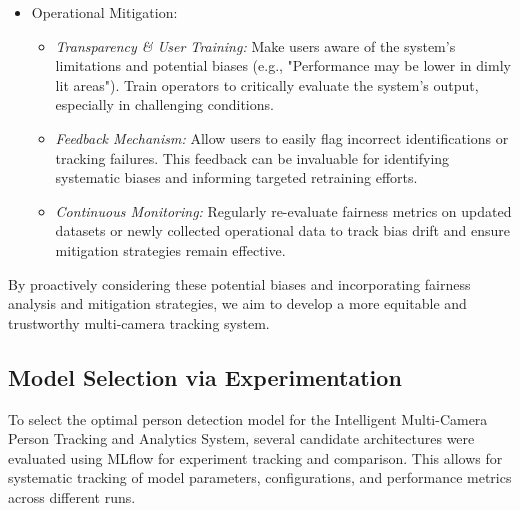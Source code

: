 \begin{itemize}
\begin{itemize}
    \end{itemize}
    \item Operational Mitigation:
    \begin{itemize}
        \item \textit{Transparency \& User Training:} Make users aware of the system's limitations and potential biases (e.g., "Performance may be lower in dimly lit areas"). Train operators to critically evaluate the system's output, especially in challenging conditions.
        \item \textit{Feedback Mechanism:} Allow users to easily flag incorrect identifications or tracking failures. This feedback can be invaluable for identifying systematic biases and informing targeted retraining efforts.
        \item \textit{Continuous Monitoring:} Regularly re-evaluate fairness metrics on updated datasets or newly collected operational data to track bias drift and ensure mitigation strategies remain effective.
    \end{itemize}
\end{itemize}
By proactively considering these potential biases and incorporating fairness analysis and mitigation strategies, we aim to develop a more equitable and trustworthy multi-camera tracking system.

\subsection{Model Selection via Experimentation}
\label{subsection:model_selection_experimentation}
To select the optimal person detection model for the Intelligent Multi-Camera Person Tracking and Analytics System, several candidate architectures were evaluated using MLflow for experiment tracking and comparison. This allows for systematic tracking of model parameters, configurations, and performance metrics across different runs.


